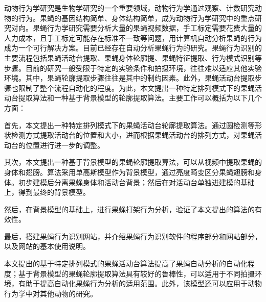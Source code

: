 \begin{cabstract}
  动物行为学研究是生物学研究的一个重要领域，动物行为学通过观察、计数研究动物的行为。果蝇的基因结构简单、身体结构简单，成为动物行为学研究中的重点研究对向。果蝇行为学研究需要分析大量的果蝇视频数据，手工标定需要花费大量的人力成本，且手工标定可能存在标准不一致等问题，用计算机自动分析果蝇的行为成为一个可行解决方案。目前已经存在自动分析果蝇行为的研究。果蝇行为识别的主要流程包括果蝇活动台提取、果蝇身体轮廓提、果蝇特征提取、行为模式识别等步骤。目前的研究一般受限于特定的实验条件和拍摄环境，往往难以适应其他实验环境。其中，果蝇轮廓提取步骤往往是其中的制约因素。此外，果蝇活动台提取步骤也限制了整个流程自动化的程度。为此，本文提出一种特定排列模式下的果蝇活动台提取算法和一种基于背景模型的轮廓提取算法。主要工作可以概括为以下几个方面：

  首先，本文提出一种特定排列模式下的果蝇活动台轮廓提取算法。通过圆检测等形状检测方式提取活动台的位置和大小，进而根据果蝇活动台的排列方式，对果蝇活动台的位置进行进一步的调整。

  其次，本文提出一种基于背景模型的果蝇轮廓提取算法，可以从视频中提取果蝇的身体和翅膀。算法采用单高斯模型作为背景模型，通过亮度畸变区分果蝇翅膀和身体。初步建模后分离果蝇身体和活动台背景；然后在对活动台单独进建模的基础上，得到最终的背景模型。

  然后，在背景模型的基础上，进行果蝇打架行为分析，验证了本文提出的算法的有效性。

  最后，搭建果蝇行为识别网站，并介绍果蝇行为识别软件的程序部分和网站部分，以及网站的基本使用说明。

  本文提出的基于特定排列模式的果蝇活动台算法提高了果蝇自动分析的自动化程度；基于背景模型的果蝇轮廓提取算法具有较好的鲁棒性，可以适用于不同拍摄环境，有助于提高自动化果蝇行为分析的适用范围。此外，该模型还可以应用于动物行为学中对其他动物的研究。


\end{cabstract}



